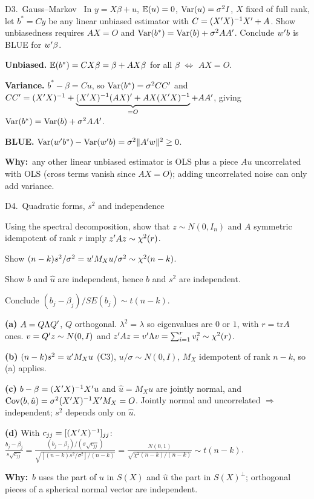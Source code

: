 \documentclass[11pt]{article}
\newcommand{\tagbox}[2]{\tcbox[on line, colback=#1, colframe=#1, coltext=white,
  boxsep=1pt, left=3pt, right=3pt, top=0pt, bottom=0pt, arc=1.5pt]{\scriptsize\sffamily\bfseries #2}}
\newcommand{\likely}{\tagbox{likelyor}{$\star\star$ LIKELY}}
\newcommand{\newtag}{\tagbox{qnavy!60}{NEW}}
\newcommand{\step}[1]{\par\smallskip\noindent\textbf{\textcolor{qnavy}{#1}}\quad\ignorespaces}
\newcommand{\Why}{\textbf{\textcolor{whyline}{Why:}}\ }
\begin{document}
\begin{qbox}{D3.\ Gauss--Markov}{\likely\ \newtag}
In $y=X\beta+u$, $\mathbb{E}(u)=0$, $\operatorname{Var}(u)=\sigma^{2}I$, $X$ fixed of full rank, let $b^{*}=Cy$ be any linear unbiased estimator with
$C=(X^{\prime} X)^{-1}X^{\prime}+A$. Show unbiasedness requires $AX=O$ and $\operatorname{Var}(b^{*})=\operatorname{Var}(b)+\sigma^{2}AA^{\prime}$. Conclude $w^{\prime} b$ is BLUE for $w^{\prime}\beta$.
\end{qbox}
\begin{solbox}
\step{Unbiased.} $\mathbb{E}(b^{*})=CX\beta=\beta+AX\beta$ for all $\beta$ $\iff$ $AX=O$.
\step{Variance.} $b^{*}-\beta=Cu$, so $\operatorname{Var}(b^{*})=\sigma^{2}CC^{\prime}$ and
$CC^{\prime}=(X^{\prime} X)^{-1}+\underbrace{(X^{\prime} X)^{-1}(AX)^{\prime}+AX(X^{\prime} X)^{-1}}_{=O}+AA^{\prime}$, giving $\operatorname{Var}(b^{*})=\operatorname{Var}(b)+\sigma^{2}AA^{\prime}$.
\step{BLUE.} $\operatorname{Var}(w^{\prime} b^{*})-\operatorname{Var}(w^{\prime} b)=\sigma^{2}\|A^{\prime} w\|^{2}\ge0$.
\begin{why}\Why any other linear unbiased estimator is OLS plus a piece $Au$ uncorrelated with OLS (cross terms vanish since $AX=O$);
adding uncorrelated noise can only add variance.\end{why}
\end{solbox}

\begin{qbox}{D4.\ Quadratic forms, $s^{2}$ and independence}{\likely\ \newtag}
\begin{flatlist}
  \item[(a)] Using the spectral decomposition, show that $z\sim N(0,I_{n})$ and $A$ symmetric idempotent of rank $r$ imply $z^{\prime} Az\sim\chi^{2}(r)$.
  \item[(b)] Show $(n-k)s^{2}/\sigma^{2}=u^{\prime} M_{X}u/\sigma^{2}\sim\chi^{2}(n-k)$.
  \item[(c)] Show $b$ and $\hat u$ are independent, hence $b$ and $s^{2}$ are independent.
  \item[(d)] Conclude $(b_{j}-\beta_{j})/SE(b_{j})\sim t(n-k)$.
\end{flatlist}
\end{qbox}
\begin{solbox}
\step{(a)} $A=Q\Lambda Q^{\prime}$, $Q$ orthogonal. $\lambda^{2}=\lambda$ so eigenvalues are $0$ or $1$, with $r=\mathrm{tr}A$ ones. $v=Q^{\prime} z\sim N(0,I)$ and
$z^{\prime} Az=v^{\prime}\Lambda v=\sum_{i=1}^{r}v_{i}^{2}\sim\chi^{2}(r)$.
\step{(b)} $(n-k)s^{2}=u^{\prime} M_{X}u$ (C3), $u/\sigma\sim N(0,I)$, $M_{X}$ idempotent of rank $n-k$, so (a) applies.
\step{(c)} $b-\beta=(X^{\prime} X)^{-1}X^{\prime} u$ and $\hat u=M_{X}u$ are jointly normal, and
$\operatorname{Cov}(b,\hat u)=\sigma^{2}(X^{\prime} X)^{-1}X^{\prime} M_{X}=O$. Jointly normal and uncorrelated $\Rightarrow$ independent; $s^{2}$ depends only on $\hat u$.
\step{(d)} With $c_{jj}=[(X^{\prime} X)^{-1}]_{jj}$:
$\frac{b_{j}-\beta_{j}}{s\sqrt{c_{jj}}}=\frac{(b_{j}-\beta_{j})/(\sigma\sqrt{c_{jj}})}{\sqrt{[(n-k)s^{2}/\sigma^{2}]/(n-k)}}=\frac{N(0,1)}{\sqrt{\chi^{2}(n-k)/(n-k)}}\sim t(n-k)$.
\begin{why}\Why $b$ uses the part of $u$ in $S(X)$ and $\hat u$ the part in $S(X)^{\perp}$; orthogonal pieces of a spherical normal vector are independent.\end{why}
\end{solbox}
\end{document}
